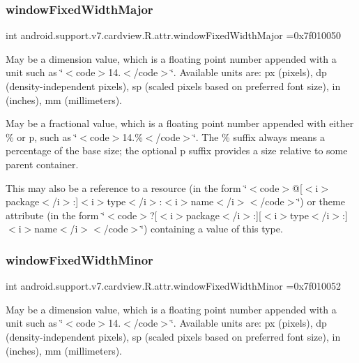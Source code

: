 \subsubsection{\texorpdfstring{window\+Fixed\+Width\+Major}{windowFixedWidthMajor}}
{\footnotesize\ttfamily int android.\+support.\+v7.\+cardview.\+R.\+attr.\+window\+Fixed\+Width\+Major =0x7f010050\hspace{0.3cm}{\ttfamily [static]}}

May be a dimension value, which is a floating point number appended with a unit such as \char`\"{}$<$code$>$14.\+5sp$<$/code$>$\char`\"{}. Available units are\+: px (pixels), dp (density-\/independent pixels), sp (scaled pixels based on preferred font size), in (inches), mm (millimeters). 

May be a fractional value, which is a floating point number appended with either \% or p, such as \char`\"{}$<$code$>$14.\%$<$/code$>$\char`\"{}. The \% suffix always means a percentage of the base size; the optional p suffix provides a size relative to some parent container. 

This may also be a reference to a resource (in the form \char`\"{}$<$code$>$@\mbox{[}$<$i$>$package$<$/i$>$\+:\mbox{]}$<$i$>$type$<$/i$>$\+:$<$i$>$name$<$/i$>$$<$/code$>$\char`\"{}) or theme attribute (in the form \char`\"{}$<$code$>$?\mbox{[}$<$i$>$package$<$/i$>$\+:\mbox{]}\mbox{[}$<$i$>$type$<$/i$>$\+:\mbox{]}$<$i$>$name$<$/i$>$$<$/code$>$\char`\"{}) containing a value of this type. \mbox{\label{classandroid_1_1support_1_1v7_1_1cardview_1_1R_1_1attr_ad2c7c50efea2d85ec1c001bd5a98c508}} 
\subsubsection{\texorpdfstring{window\+Fixed\+Width\+Minor}{windowFixedWidthMinor}}
{\footnotesize\ttfamily int android.\+support.\+v7.\+cardview.\+R.\+attr.\+window\+Fixed\+Width\+Minor =0x7f010052\hspace{0.3cm}{\ttfamily [static]}}

May be a dimension value, which is a floating point number appended with a unit such as \char`\"{}$<$code$>$14.\+5sp$<$/code$>$\char`\"{}. Available units are\+: px (pixels), dp (density-\/independent pixels), sp (scaled pixels based on preferred font size), in (inches), mm (millimeters). 

